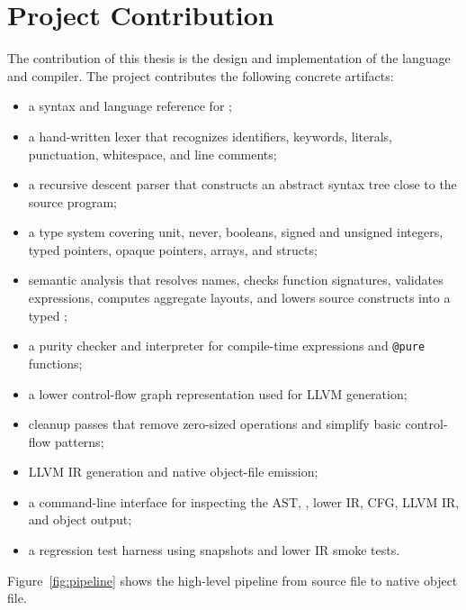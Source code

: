 \section{Project Contribution}

The contribution of this thesis is the design and implementation of the \epl{}
language and compiler. The project contributes the following concrete artifacts:

\begin{itemize}
  \item a syntax and language reference for \epl{};
  \item a hand-written lexer that recognizes identifiers, keywords, literals,
        punctuation, whitespace, and line comments;
  \item a recursive descent parser that constructs an abstract syntax tree close
        to the source program;
  \item a type system covering unit, never, booleans, signed and unsigned
        integers, typed pointers, opaque pointers, arrays, and structs;
  \item semantic analysis that resolves names, checks function signatures,
        validates expressions, computes aggregate layouts, and lowers source
        constructs into a typed \irtree{};
  \item a purity checker and interpreter for compile-time expressions and
        \texttt{@pure} functions;
  \item a lower control-flow graph representation used for LLVM generation;
  \item cleanup passes that remove zero-sized operations and simplify basic
        control-flow patterns;
  \item LLVM IR generation and native object-file emission;
  \item a command-line interface for inspecting the AST, \irtree{}, lower IR,
        CFG, LLVM IR, and object output;
  \item a regression test harness using \irtree{} snapshots and lower IR smoke
        tests.
\end{itemize}

Figure~\ref{fig:pipeline} shows the high-level pipeline from source file to native object file.

